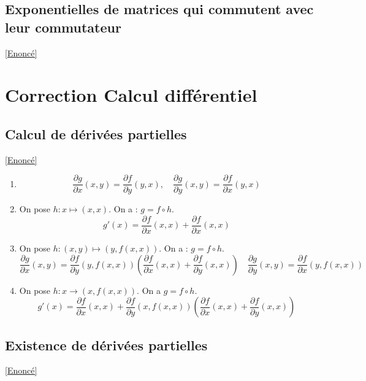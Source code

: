 \documentclass{book}
\begin{document}
	\subsection{Exponentielles de matrices qui commutent avec leur commutateur}
	\label{Exponentielles de matrices qui commutent avec leur commutateur corrigé}
	\textcolor{blue}{\hyperref[Exponentielles de matrices qui commutent avec leur commutateur]{[Enoncé]}}\\
	
	
	\newpage
\section{Correction Calcul différentiel}
	\subsection{Calcul de dérivées partielles}
	\label{Calculs de dérivées partielles corrigé}
	\textcolor{blue}{\hyperref[Calcul de dérivées partielles]{[Enoncé]}}\\
	\begin{enumerate}
		\item $$\frac{\partial g}{\partial x}(x,y)=\frac{\partial f}{\partial y}(y,x), \quad \frac{\partial g}{\partial y}(x,y)=\frac{\partial f}{\partial x}(y,x)$$
		\item On pose $h:x\mapsto (x,x)$. On a : $g=f\circ h$.\\
		$$g'(x)=\frac{\partial f}{\partial x}(x,x)+\frac{\partial f}{\partial x}(x,x)$$
		\item On pose $h:(x,y)\mapsto (y,f(x,x))$. On a : $g=f\circ h$.\\
		$$\frac{\partial g}{\partial x}(x,y)=\frac{\partial f}{\partial y}(y,f(x,x))\left(\frac{\partial f}{\partial x}(x,x)+\frac{\partial f}{\partial y}(x,x)\right) \quad \frac{\partial g}{\partial y}(x,y)=\frac{\partial f}{\partial x}(y,f(x,x))$$
		\item On pose $h:x\to(x,f(x,x))$. On a $g=f\circ h$.\\
		$$g'(x)=\frac{\partial f}{\partial x}(x,x)+\frac{\partial f}{\partial y}(x,f(x,x))\left(\frac{\partial f}{\partial x}(x,x)+\frac{\partial f}{\partial y}(x,x)\right)$$
	\end{enumerate}
	
	
	\subsection{Existence de dérivées partielles}
	\label{Existence de dérivées partielles corrigé}
	\textcolor{blue}{\hyperref[Existence de dérivées partielles]{[Enoncé]}}\\
	
\end{document}
